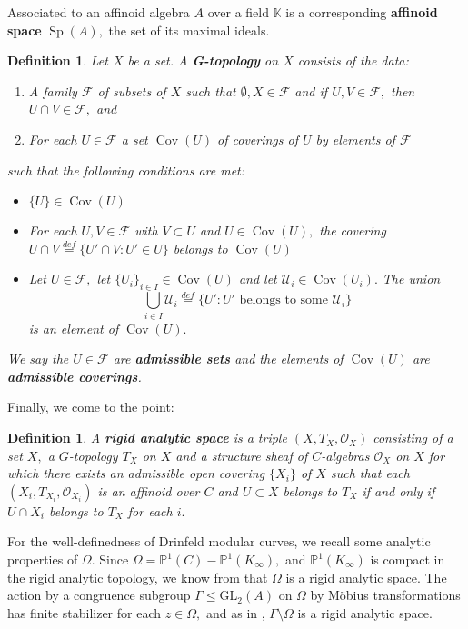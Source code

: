 \documentclass[11pt]{amsart}
\newtheorem{definition}[theorem]{Definition}
\theoremstyle{definition}
\numberwithin{equation}{section}
\newcommand{\GL}{\mathrm{GL}} 	%
\newcommand{\cO}{\mathcal{O}}		%
\newcommand{\cU}{\mathcal{U}}		%
\newcommand{\sF}{\mathscr{F}}		%
\newcommand{\bbK}{\mathbb{K}}		%
\newcommand{\bbP}{\mathbb{P}}		%
\begin{document}
		Associated to an affinoid algebra $A$ over a field $\bbK$ is a corresponding \textbf{affinoid space} $\operatorname{Sp}(A),$ the set of its maximal ideals. 
		
		\begin{definition}\cite[Definition $2.4.1$]{Frensel-vanderPut-Rigid-Analytic_Geom}
			Let $X$ be a set. A \textbf{G-topology} on $X$ consists of the data:
			\begin{enumerate}
				\item A family $\sF$ of subsets of $X$ such that $\emptyset, X\in \sF$ and if $U,V\in \sF,$ then $U\cap V\in \sF,$ and 
				\item For each $U\in \sF$ a set $\operatorname{Cov}(U)$ of coverings of $U$ by elements of $\sF$
			\end{enumerate}
			such that the following conditions are met:
			\begin{itemize}
				\item $\{U\}\in \operatorname{Cov}(U)$
				\item For each $U,V\in \sF$ with $V\subset U$ and $U\in \operatorname{Cov}(U),$ the covering $\displaystyle{U\cap V\overset{def}{=}\{U'\cap V: U'\in U\}}$ belongs to $\operatorname{Cov}(U)$
				\item Let $U\in \sF,$ let $\{U_i\}_{i\in I}\in \operatorname{Cov}(U)$ and let $\cU_i\in \operatorname{Cov}(U_i).$ The union \[\bigcup_{i\in I} \cU_i\overset{def}{=}\{U':U'\text{ belongs to some }\cU_i \}\] is an element of $\operatorname{Cov}(U).$
			\end{itemize}
			We say the $U\in \sF$ are \textbf{admissible sets} and the elements of $\operatorname{Cov}(U)$ are \textbf{admissible coverings}.
		\end{definition}
		
		Finally, we come to the point:
		\begin{definition}\cite[Definition $4.3.1$]{Frensel-vanderPut-Rigid-Analytic_Geom}
			A \textbf{rigid analytic space} is a triple $(X,T_X,\cO_X)$ consisting of a set $X,$ a $G$-topology $T_X$ on $X$ and a structure sheaf of $C$-algebras $\cO_X$ on $X$ for which there exists an admissible open covering $\{X_i\}$ of $X$ such that each $(X_i,T_{X_i},\cO_{X_i})$ is an affinoid over $C$ and $U\subset X$ belongs to $T_X$ if and only if $U\cap X_i$ belongs to $T_X$ for each $i.$ 
		\end{definition}
		
		For the well-definedness of Drinfeld modular curves, we recall some analytic properties of $\Omega.$
		Since $\Omega=\bbP^1(C)-\bbP^1(K_{\infty}),$ and $\bbP^1(K_{\infty})$ is compact in the rigid analytic topology, we know from \cite[Section $1.2$]{Gekeler-jacobians} that $\Omega$ is a rigid analytic space. The action by  a congruence subgroup $\Gamma\leq \GL_2(A)$ on $\Omega$ by M\"obius transformations has finite stabilizer for each $z\in \Omega,$ and as in \cite[Sections $(2.5)$ and $(2.6)$]{Gekeler-jacobians}, $\Gamma\setminus \Omega$ is a rigid analytic space.\\
		
\end{document}
